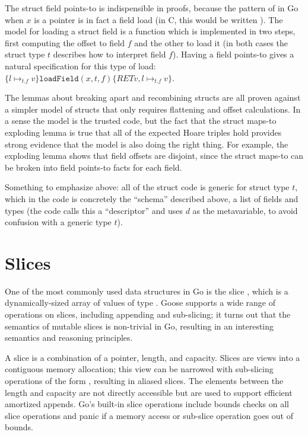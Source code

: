 The struct field points-to is indispensible in proofs, because the
pattern of  in Go when \(x\) is a pointer is in fact a field
load (in C, this would be written ). The model
for loading a struct field is a function 
which is implemented in two steps, first computing the offset to field
\(f\) and the other to load it (in both cases the struct type \(t\)
describes how to interpret field \(f\)). Having a field points-to gives
a natural specification for this type of load:
\(\{ l \mapsto_{t.f} v \} \mathtt{loadField}(x, t, f) \{ RET v, l \mapsto_{t.f} v\}\).

The lemmas about breaking apart and recombining structs are all proven
against a simpler model of structs that only requires flattening and
offset calculations. In a sense the model is the trusted code, but the
fact that the struct maps-to exploding lemma is true that all of the
expected Hoare triples hold provides strong evidence that the model is
also doing the right thing. For example, the exploding lemma shows that
field offsets are disjoint, since the struct maps-to can be broken into
field points-to facts for each field.

Something to emphasize above: all of the struct code is generic for
struct type \(t\), which in the code is concretely the ``schema''
described above, a list of fields and types (the code calls this a
``descriptor'' and uses \(d\) as the metavariable, to avoid confusion
with a generic type \(t\)).

\section{Slices}

One of the most commonly used data structures in Go is the slice
, which is a dynamically-sized array of values of type
. Goose supports a wide range of operations on slices,
including appending and sub-slicing; it turns out that the semantics of
mutable slices is non-trivial in Go, resulting in an interesting
semantics and reasoning principles.

A slice is a combination of a pointer, length, and capacity. Slices are
views into a contiguous memory allocation; this view can be narrowed
with sub-slicing operations of the form , resulting
in aliased slices. The elements between the length and capacity are not
directly accessible but are used to support efficient amortized appends.
Go's built-in slice operations include bounds checks on all slice
operations and panic if a memory access or sub-slice operation goes out
of bounds.

